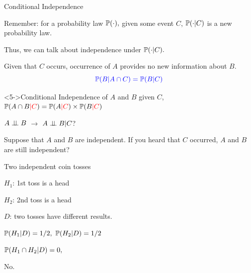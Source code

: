 \begin{frame}{Conditional Independence}

\plitemsep 0.07in
\bci 

\item<2-> Remember: for a probability law $\mathbb{P}( \cdot ),$ given some event $C$, $\mathbb{P}( \cdot | C )$ is a new probability law. 

\item<3-> Thus, we can talk about independence under $\mathbb{P}( \cdot | C ).$

\item<4-> Given that $C$ occurs, occurrence of $A$ provides no new information about $B.$
$$
{\color{blue} \mathbb{P}( B | A \cap C ) = \mathbb{P}( B | C )}
$$
\vspace{-0.2in}

\item {}

\begin{block}<5->{Conditional Independence of $A$ and $B$ given $C$, }
$\mathbb{P}( A \cap B {\color{red} | C} ) = \mathbb{P}( A {\color{red} |C} ) \times \mathbb{P}( B {\color{red} |C} )$
\end{block}




\eci 
\end{frame}

\begin{frame}{ $A \perp \!\!\! \perp B$ $\rightarrow$  $A \perp \!\!\! \perp B | C$?}

\plitemsep 0.2in
\bci 

\item Suppose that $A$ and $B$ are independent. If you heard that $C$ occurred,  $A$ and $B$ are still independent? 

\item<2-> Two independent coin tosses

\plitemsep 0.05in
\bci
\item $H_1$: 1st toss is a head
\item $H_2$: 2nd toss is a head
\item $D$: two tosses have different results.
\eci

\item<3-> $\mathbb{P}( H_1 | D ) = 1/2,$ $\mathbb{P}( H_2 | D ) = 1/2$  


\item<4-> $\mathbb{P}( H_1 \cap H_2 | D ) = 0,$  

\item<5-> No.
\eci 
\end{frame}

